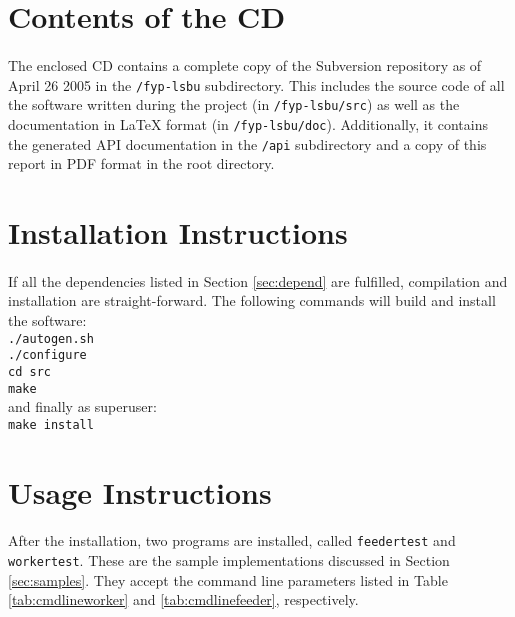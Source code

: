 \appendix
\appendixpage
\addappheadtotoc


\section{Contents of the CD}
\paragraph{}
The enclosed CD contains a complete copy of the Subversion repository as of April 26 2005 in the \texttt{/fyp-lsbu} subdirectory. This includes the source code of all the software written during the project (in \texttt{/fyp-lsbu/src}) as well as the documentation in \LaTeX{} format (in \texttt{/fyp-lsbu/doc}). Additionally, it contains the generated API documentation in the \texttt{/api} subdirectory and a copy of this report in PDF format in the root directory.

\section{Installation Instructions}
\paragraph{}
If all the dependencies listed in Section \ref{sec:depend} are fulfilled, compilation and installation are straight-forward. The following commands will build and install the software:
\\ \texttt{./autogen.sh}
\\ \texttt{./configure}
\\ \texttt{cd src}
\\ \texttt{make} \\

and finally as superuser:
\\ \texttt{make install} \\

\section{Usage Instructions}
\paragraph{}
After the installation, two programs are installed, called \texttt{feedertest} and \texttt{workertest}. These are the sample implementations discussed in Section \ref{sec:samples}. They accept the command line parameters listed in Table \ref{tab:cmdlineworker} and \ref{tab:cmdlinefeeder}, respectively.


